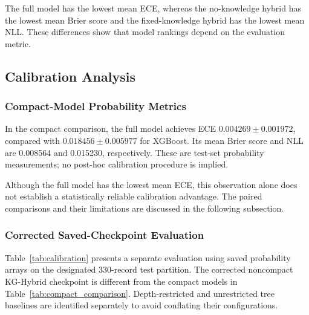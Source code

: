The full model has the lowest mean ECE, whereas the no-knowledge
hybrid has the lowest mean Brier score and the fixed-knowledge hybrid
has the lowest mean NLL. These differences show that model rankings
depend on the evaluation metric.

\subsection{Calibration Analysis}

\subsubsection{Compact-Model Probability Metrics}

In the compact comparison, the full model achieves ECE
$0.004269\pm0.001972$, compared with
$0.018456\pm0.005977$ for XGBoost.
Its mean Brier score and NLL are 0.008564 and 0.015230,
respectively. These are test-set probability measurements; no
post-hoc calibration procedure is implied.

Although the full model has the lowest mean ECE, this observation
alone does not establish a statistically reliable calibration
advantage. The paired comparisons and their limitations are
discussed in the following subsection.

\subsubsection{Corrected Saved-Checkpoint Evaluation}

Table~\ref{tab:calibration} presents a separate evaluation using
saved probability arrays on the designated 330-record test partition.
The corrected noncompact KG-Hybrid checkpoint is different from
the compact models in Table~\ref{tab:compact_comparison}.
Depth-restricted and unrestricted tree baselines are identified
separately to avoid conflating their configurations.

